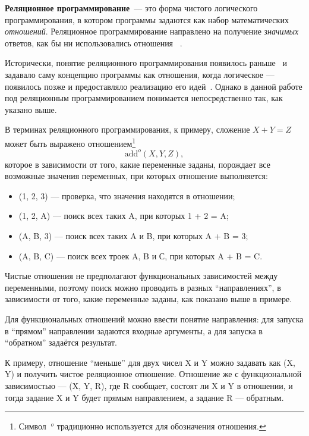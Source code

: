 {\bf Реляционное программирование}~--- это форма чистого логического
программирования, в котором программы задаются как набор
математических {\it отношений}. Реляционное программирование направлено
на получение \emph{значимых} ответов, как бы ни использовались отношения
~\cite{byrdMK}.

Исторически, понятие реляционного программирования появилось
раньше~\cite{relML} и задавало саму концепцию программы как отношения,
когда логическое --- появилось позже и предоставляло реализацию его
идей~\cite{logicMJ}.
Однако в данной работе под реляционным программированием понимается
непосредственно так, как указано выше.

В терминах реляционного программирования, к примеру, сложение $X + Y = Z$
может быть выражено отношением\footnote{Символ $\ ^o$ традиционно
используется для обозначения отношения.}
\[\text{add}^o (X, Y, Z),\]
которое в зависимости от того, какие переменные заданы, порождает
все возможные значения переменных, при которых отношение выполняется:
\begin{itemize}
\item {}(1, 2, 3) --- проверка, что значения находятся в отношении;
\item {}(1, 2, A) --- поиск всех таких A, при которых 1 + 2 = A;
\item {}(A, B, 3) --- поиск всех таких A и B, при которых A + B = 3;
\item {}(A, B, C) --- поиск всех троек A, B и С, при которых A + B = C.
\end{itemize}

Чистые отношения не предполагают функциональных зависимостей между переменными,
поэтому поиск можно проводить в разных ``направлениях'', в зависимости от
того, какие переменные заданы, как показано выше в примере.

Для функциональных отношений можно ввести понятие направления: для запуска
в ``прямом'' направлении задаются входные аргументы, а для запуска в
``обратном'' задаётся результат.

К примеру, отношение ``меньше'' для двух чисел X и Y можно задавать как
(X, Y) и получить чистое реляционное отношение.
Отношение же с функциональной зависимостью ---
(X, Y, R), где R сообщает, состоят ли X и Y
в отношении, и тогда задание X и Y будет
прямым направлением, а задание R --- обратным.

